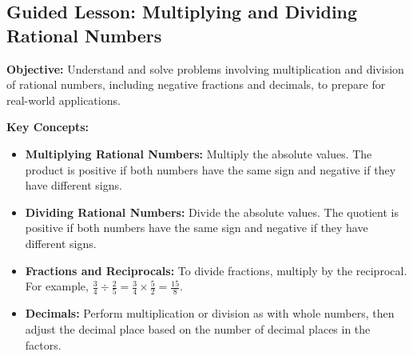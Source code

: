 \documentclass[12pt]{article}
\title{}
\date{}
\begin{document}
\subsection*{Guided Lesson: Multiplying and Dividing Rational Numbers}
\onehalfspacing

\begin{tcolorbox}[colframe=black!40, colback=gray!5, 
coltitle=black, colbacktitle=black!20, fonttitle=\bfseries\Large, 
title=Learning Objective, halign title=center, left=5pt, right=5pt, top=5pt, bottom=15pt]
\textbf{Objective:} Understand and solve problems involving multiplication and division of rational numbers, including negative fractions and decimals, to prepare for real-world applications.
\end{tcolorbox}

\vspace{1em}

\begin{tcolorbox}[colframe=black!60, colback=white, 
coltitle=black, colbacktitle=black!15, fonttitle=\bfseries\Large, 
title=Key Concepts and Vocabulary, halign title=center, left=10pt, right=10pt, top=10pt, bottom=15pt]
\textbf{Key Concepts:}
\begin{itemize}
    \item \textbf{Multiplying Rational Numbers:} Multiply the absolute values. The product is positive if both numbers have the same sign and negative if they have different signs.
    \item \textbf{Dividing Rational Numbers:} Divide the absolute values. The quotient is positive if both numbers have the same sign and negative if they have different signs.
    \item \textbf{Fractions and Reciprocals:} To divide fractions, multiply by the reciprocal. For example, \( \frac{3}{4} \div \frac{2}{5} = \frac{3}{4} \times \frac{5}{2} = \frac{15}{8} \).
    \item \textbf{Decimals:} Perform multiplication or division as with whole numbers, then adjust the decimal place based on the number of decimal places in the factors.
\end{itemize}
\end{tcolorbox}

\vspace{1em}
\end{document}
